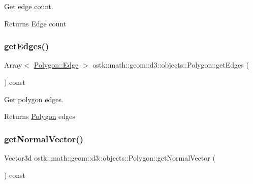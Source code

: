 Get edge count. 

\begin{DoxyReturn}{Returns}
Edge count 
\end{DoxyReturn}
\mbox{\label{classostk_1_1math_1_1geom_1_1d3_1_1objects_1_1_polygon_a2abe9ca5bd137591718a0b28834fe617}} 
\subsubsection{\texorpdfstring{get\+Edges()}{getEdges()}}
{\footnotesize\ttfamily Array$<$ \hyperlink{classostk_1_1math_1_1geom_1_1d3_1_1objects_1_1_polygon_a58c9a7e93e903b2226804116cce4f1ec}{Polygon\+::\+Edge} $>$ ostk\+::math\+::geom\+::d3\+::objects\+::\+Polygon\+::get\+Edges (\begin{DoxyParamCaption}{ }\end{DoxyParamCaption}) const}



Get polygon edges. 

\begin{DoxyReturn}{Returns}
\hyperlink{classostk_1_1math_1_1geom_1_1d3_1_1objects_1_1_polygon}{Polygon} edges 
\end{DoxyReturn}
\mbox{\label{classostk_1_1math_1_1geom_1_1d3_1_1objects_1_1_polygon_a5368f76bf510c686820d493d8c6f510f}} 
\subsubsection{\texorpdfstring{get\+Normal\+Vector()}{getNormalVector()}}
{\footnotesize\ttfamily Vector3d ostk\+::math\+::geom\+::d3\+::objects\+::\+Polygon\+::get\+Normal\+Vector (\begin{DoxyParamCaption}{ }\end{DoxyParamCaption}) const}



